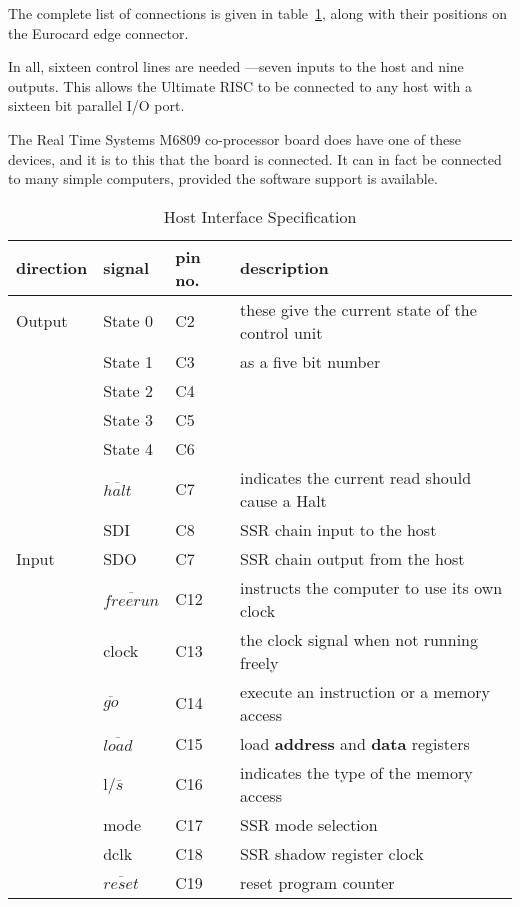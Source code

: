 The complete list of connections is given in  table~\ref{table:hostif}, along 
with their positions on the Eurocard edge connector.

In all, sixteen control lines are needed ---seven inputs to the host and nine outputs.
This allows the Ultimate RISC to be connected to any host with a sixteen bit parallel I/O port.

The Real Time Systems M6809 co-processor board does have one of these devices, and
it is to this that the board is  connected. It can in fact be connected to many simple computers, provided the software support is available.

\begin{table}
\centering
\begin{tabular}{||l|lll||}
\hline
direction & signal & pin no. & description \\
\hline 
Output
 & State 0 & C2 & these give the current state of the control unit\\
 & State 1 & C3 & as a five bit number\\
 & State 2 & C4 & \\
 & State 3 & C5 & \\
 & State 4 & C6 & \\
 & $\overline{halt}$	& C7 & indicates the current read should cause a Halt\\
 & SDI	& C8 & SSR chain input to the host\\
\hline
Input 
 & SDO & C7 & SSR chain output from the host\\
 & $\overline{freerun}$ & C12 & instructs the computer to use its own clock\\
 & clock & C13 & the clock signal when not running freely\\
 & $\overline{go}$ & C14 & execute an instruction or a memory access\\
 & $\overline{load}$ & C15 & load {\bf address} and {\bf data} registers\\
 & l/$\overline{s}$ & C16 & indicates the type of the memory access\\
 & mode & C17 & SSR mode selection \\
 & dclk & C18 & SSR shadow register clock\\
 & $\overline{reset}$ & C19 & reset program counter\\
 \hline
 \end{tabular}
 \caption{Host Interface Specification}
\label{table:hostif}
 \end{table}
 
